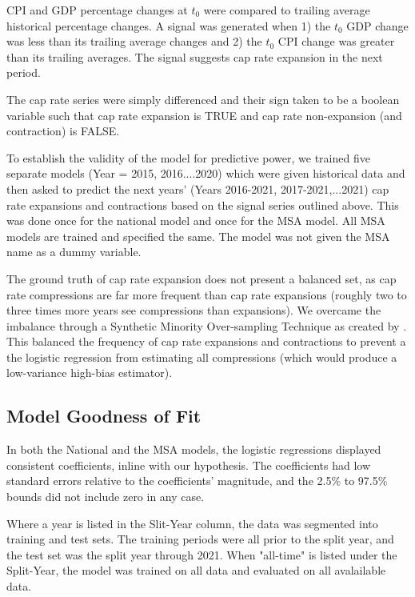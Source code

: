 CPI and GDP percentage changes at $t_0$ were compared to trailing average historical percentage changes. A  signal was generated when 1) the $t_0$ GDP change was less than its trailing average changes and 2) the $t_0$ CPI change was greater than its trailing averages. The signal suggests cap rate expansion in the next period. 

The cap rate series were simply differenced and their sign taken to be a boolean variable such that cap rate expansion is TRUE and cap rate non-expansion (and contraction) is FALSE.

To establish the validity of the model for predictive power, we trained five separate models (Year = 2015, 2016....2020) which were given historical data and then asked to predict the next years' (Years 2016-2021, 2017-2021,...2021) cap rate expansions and contractions based on the signal series outlined above. This was done once for the national model and once for the MSA model. All MSA models are trained and specified the same. The model was not given the MSA name as a dummy variable.  

The ground truth of cap rate expansion does not present a balanced set, as cap rate compressions are far more frequent than cap rate expansions (roughly two to three times more years see compressions than expansions). We overcame the imbalance through a Synthetic Minority Over-sampling Technique as created by \citep*{SMOTE}. This balanced the frequency of cap rate expansions and contractions to prevent a the logistic regression from estimating all compressions (which would produce a low-variance high-bias estimator).

\subsection{Model Goodness of Fit}

In both the National and the MSA models, the logistic regressions displayed consistent coefficients, inline with our hypothesis. The coefficients had low standard errors relative  to the coefficients' magnitude, and the 2.5\% to 97.5\% bounds did not include zero in any case. 

Where a year is listed in the Slit-Year column, the data was segmented into training and test sets. The training periods were all prior to the split year, and the test set was the split year through 2021. When "all-time" is listed under the Split-Year, the model was trained on all data and evaluated on all avalailable data. 

